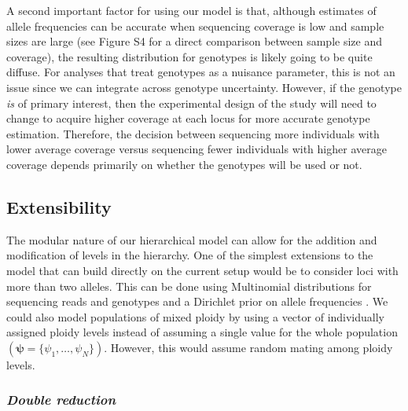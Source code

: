 \documentclass[11pt,english,letterpaper,oneside]{article}
\begin{document}
A second important factor for using our model is that, although estimates of allele frequencies can be accurate when sequencing coverage is low and sample sizes are large (see Figure S4 for a direct comparison between sample size and coverage), the resulting distribution for genotypes is likely going to be quite diffuse. For analyses that treat genotypes as a nuisance parameter, this is not an issue since we can integrate across genotype uncertainty. However, if the genotype \textit{is} of primary interest, then the experimental design of the study will need to change to acquire higher coverage at each locus for more accurate genotype estimation. Therefore, the decision between sequencing more individuals with lower average coverage versus sequencing fewer individuals with higher average coverage depends primarily on whether the genotypes will be used or not.

\medskip
\subsection{Extensibility}
\medskip

The modular nature of our hierarchical model can allow for the addition and modification of levels in the hierarchy. One of the simplest extensions to the model that can build directly on the current setup would be to consider loci with more than two alleles. This can be done using Multinomial distributions for sequencing reads and genotypes and a Dirichlet prior on allele frequencies \citep[the Multinomial and Dirichlet distributions form a conjugate family;][]{gelman2014bayesian}. We could also model populations of mixed ploidy by using a vector of individually assigned ploidy levels instead of assuming a single value for the whole population $(\bm{\psi} = \{\psi_1,\ldots,\psi_N\})$. However, this would assume random mating among ploidy levels.
\medskip


\subsubsection{{\itshape Double reduction}}
\medskip
\end{document}
